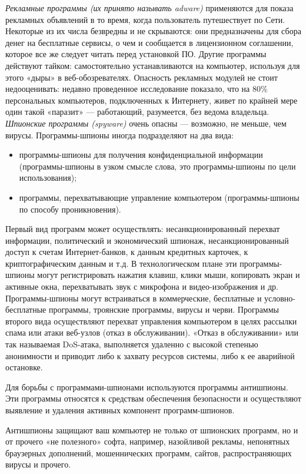 \textit{Рекламные программы (их принято называть adware)} применяются для показа
рекламных объявлений в то время, когда пользователь путешествует по Сети.
Некоторые из их числа безвредны и не скрываются: они предназначены для сбора
денег на бесплатные сервисы, о чем и сообщается в лицензионном соглашении,
которое все же следует читать перед установкой ПО. Другие программы действуют
тайком: самостоятельно устанавливаются на компьютер, используя для этого «дыры»
в веб-обозревателях. Опасность рекламных модулей не стоит недооценивать:
недавно проведенное исследование показало, что на 80\% персональных компьютеров,
подключенных к Интернету, живет по крайней мере один такой «паразит» --- работающий,
разумеется, без ведома владельца.
\textit{Шпионские программы (spyware)} очень опасны --- возможно,
не меньше, чем вирусы.
Программы-шпионы иногда подразделяют на два вида:
\begin{itemize}
\item программы-шпионы для получения конфиденциальной
информации (программы-шпионы в узком смысле слова, это программы-шпионы по цели использования);
\item программы, перехватывающие управление компьютером (программы-шпионы по способу проникновения).
\end{itemize}

Первый вид программ может осуществлять: несанкционированный перехват информации,
политический и экономический шпионаж,
несанкционированный доступ к счетам Интернет-банков, к данным кредитных карточек,
к криптографическим данным и т.д. В технологическом плане эти программы-шпионы
могут регистрировать нажатия клавиш, клики мыши, копировать экран и активные окна,
перехватывать звук с микрофона и видео-изображения и др. Программы-шпионы могут
встраиваться в коммерческие, бесплатные и условно-бесплатные программы,
троянские программы, вирусы и черви.
Программы второго вида осуществляют перехват управления компьютером в целях
рассылки спама или атаки веб-узлов (отказ в обслуживании). «Отказ в обслуживании» или
так называемая DoS-атака, выполняется удаленно с высокой степенью анонимности
и приводит либо к захвату ресурсов системы, либо к ее аварийной остановке.

Для борьбы с программами-шпионами используются программы антишпионы.
Эти программы относятся к средствам обеспечения безопасности и осуществляют
выявление и удаления активных компонент программ-шпионов.

Антишпионы защищают ваш компьютер не только от шпионских программ,
но и от прочего «не полезного» софта, например, назойливой рекламы,
непонятных браузерных дополнений, мошеннических программ, сайтов, распространяющих вирусы и прочего.

